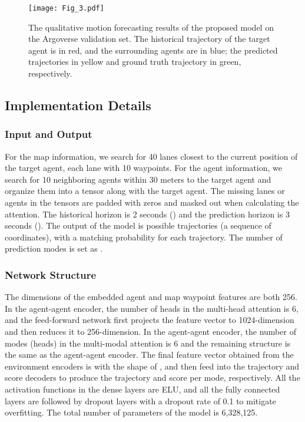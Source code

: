 \documentclass[letterpaper, 10 pt, conference]{ieeeconf}
\begin{document}
\begin{figure*}[htp]
    \centering
    \texttt{[image: Fig\_3.pdf]}
    \caption{The qualitative motion forecasting results of the proposed model on the Argoverse validation set. The historical trajectory of the target agent is in red, and the surrounding agents are in blue; the predicted trajectories in yellow and ground truth trajectory in green, respectively.}
    \label{fig:fig.3}
\end{figure*}

\subsection{Implementation Details}
\subsubsection{Input and Output} 
For the map information, we search for 40 lanes closest to the current position of the target agent, each lane with 10 waypoints. For the agent information, we search for 10 neighboring agents within 30 meters to the target agent and organize them into a tensor along with the target agent. The missing lanes or agents in the tensors are padded with zeros and masked out when calculating the attention. The historical horizon is 2 seconds () and the prediction horizon is 3 seconds (). The output of the model is  possible trajectories (a sequence of  coordinates), with a matching probability for each trajectory. The number of prediction modes is set as .

\subsubsection{Network Structure}
The dimensions of the embedded agent and map waypoint features are both 256. In the agent-agent encoder, the number of heads in the multi-head attention is 6, and the feed-forward network first projects the feature vector to 1024-dimension and then reduces it to 256-dimension. In the agent-agent encoder, the number of modes (heads) in the multi-modal attention is 6 and the remaining structure is the same as the agent-agent encoder. The final feature vector obtained from the environment encoders is with the shape of , and then feed into the trajectory and score decoders to produce the trajectory and score per mode, respectively. All the activation functions in the dense layers are ELU, and all the fully connected layers are followed by dropout layers with a dropout rate of 0.1 to mitigate overfitting. The total number of parameters of the model is 6,328,125.
\end{document}
